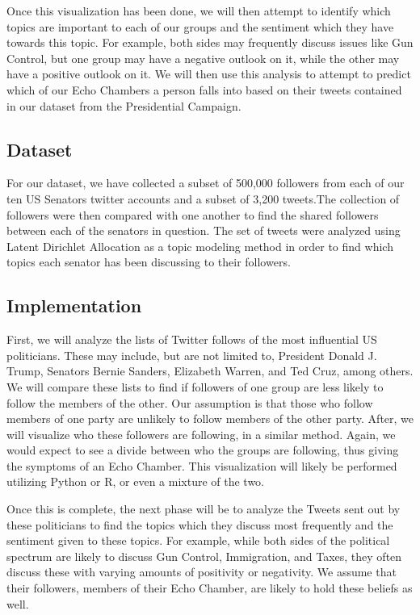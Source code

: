 \documentclass[journal]{IEEEtran}
\begin{document}
	Once this visualization has been done, we will then attempt to identify which topics are important to each of our groups and the sentiment which they have towards this topic. For example, both sides may frequently discuss issues like Gun Control, but one group may have a negative outlook on it, while the other may have a positive outlook on it. We will then use this analysis to attempt to predict which of our Echo Chambers a person falls into based on their tweets contained in our dataset from the Presidential Campaign.
	
	\subsection{Dataset}
	
	For our dataset, we have collected a subset of 500,000 followers from each of our ten US Senators twitter accounts and a subset of 3,200 tweets.The collection of followers were then compared with one another to find the shared followers between each of the senators in question. The set of tweets were analyzed using Latent Dirichlet Allocation as a topic modeling method in order to find which topics each senator has been discussing to their followers. 
	
	\subsection{Implementation}
	
	First, we will analyze the lists of Twitter follows of the most influential US politicians. These may include, but are not limited to, President Donald J. Trump, Senators Bernie Sanders, Elizabeth Warren, and Ted Cruz, among others. We will compare these lists to find if followers of one group are less likely to follow the members of the other. Our assumption is that those who follow members of one party are unlikely to follow members of the other party. After, we will visualize who these followers are following, in a similar method. Again, we would expect to see a divide between who the groups are following, thus giving the symptoms of an Echo Chamber. This visualization will likely be performed utilizing Python or R, or even a mixture of the two. 
	
	Once this is complete, the next phase will be to analyze the Tweets sent out by these politicians to find the topics which they discuss most frequently and the sentiment given to these topics. For example, while both sides of the political spectrum are likely to discuss Gun Control, Immigration, and Taxes, they often discuss these with varying amounts of positivity or negativity. We assume that their followers, members of their Echo Chamber, are likely to hold these beliefs as well. 
	
\end{document}
